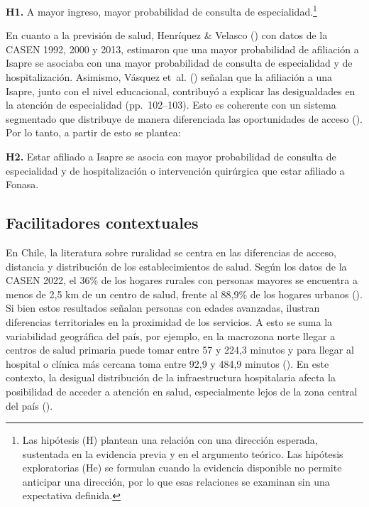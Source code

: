 \documentclass[
  spanish,
  a4paper,
  oneside]{scrbook}
\begin{document}
\textbf{H1.} A mayor ingreso, mayor probabilidad de consulta de
especialidad.\footnote{Las hipótesis (H) plantean una relación con una
  dirección esperada, sustentada en la evidencia previa y en el
  argumento teórico. Las hipótesis exploratorias (He) se formulan cuando
  la evidencia disponible no permite anticipar una dirección, por lo que
  esas relaciones se examinan sin una expectativa definida.}

En cuanto a la previsión de salud, Henríquez \& Velasco
() con datos de la
CASEN 1992, 2000 y 2013, estimaron que una mayor probabilidad de
afiliación a Isapre se asociaba con una mayor probabilidad de consulta
de especialidad y de hospitalización. Asimismo, Vásquez et~al.
() señalan que la
afiliación a una Isapre, junto con el nivel educacional, contribuyó a
explicar las desigualdades en la atención de especialidad
(pp.~102--103). Esto es coherente con un sistema segmentado que
distribuye de manera diferenciada las oportunidades de acceso
(). Por lo tanto, a partir de esto se plantea:

\textbf{H2.} Estar afiliado a Isapre se asocia con mayor probabilidad de
consulta de especialidad y de hospitalización o intervención quirúrgica
que estar afiliado a Fonasa.

\subsection{Facilitadores
contextuales}\label{facilitadores-contextuales}

En Chile, la literatura sobre ruralidad se centra en las diferencias de
acceso, distancia y distribución de los establecimientos de salud. Según
los datos de la CASEN 2022, el 36\% de los hogares rurales con personas
mayores se encuentra a menos de 2,5 km de un centro de salud, frente al
88,9\% de los hogares urbanos
(). Si bien estos resultados señalan
personas con edades avanzadas, ilustran diferencias territoriales en la
proximidad de los servicios. A esto se suma la variabilidad geográfica
del país, por ejemplo, en la macrozona norte llegar a centros de salud
primaria puede tomar entre 57 y 224,3 minutos y para llegar al hospital
o clínica más cercana toma entre 92,9 y 484,9 minutos
(). En este contexto, la desigual
distribución de la infraestructura hospitalaria afecta la posibilidad de
acceder a atención en salud, especialmente lejos de la zona central del
país ().
\end{document}
